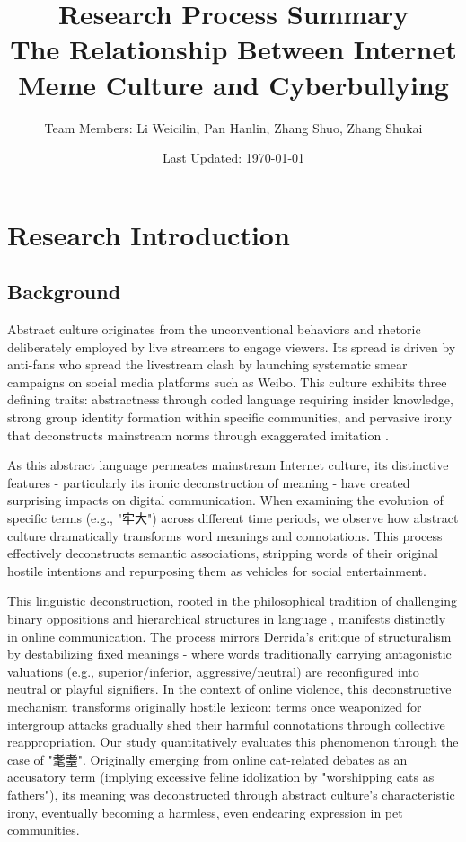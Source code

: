 \documentclass[12pt,a4paper]{ctexart}
\title{
    {\Large Research Process Summary}\\
    {\large The Relationship Between Internet Meme Culture and Cyberbullying}
}
\author{
    {\small Team Members: Li Weicilin, Pan Hanlin, Zhang Shuo, Zhang Shukai}\\
}
\date{Last Updated: \today}
\theoremstyle{MyLineTheoremStyle}
\theoremstyle{MyBlockTheoremStyle}
\theoremstyle{MySubsubsectionStyle}
\begin{document}
\maketitle
\tableofcontents
\newpage

\section{Research Introduction}
\subsection{Background}

Abstract culture originates from the unconventional behaviors and rhetoric deliberately employed by live streamers to engage viewers. Its spread is driven by anti-fans who spread the livestream clash by launching systematic smear campaigns on social media platforms such as Weibo. This culture exhibits three defining traits: abstractness through coded language requiring insider knowledge, strong group identity formation within specific communities, and pervasive irony that deconstructs mainstream norms through exaggerated imitation \cite{zheng2024chinese}.

As this abstract language permeates mainstream Internet culture, its distinctive features - particularly its ironic deconstruction of meaning - have created surprising impacts on digital communication. When examining the evolution of specific terms (e.g., "牢大") across different time periods, we observe how abstract culture dramatically transforms word meanings and connotations. This process effectively deconstructs semantic associations, stripping words of their original hostile intentions and repurposing them as vehicles for social entertainment.

This linguistic deconstruction, rooted in the philosophical tradition of challenging binary oppositions and hierarchical structures in language \cite{liu2019deconstruction}, manifests distinctly in online communication. The process mirrors Derrida's critique of structuralism by destabilizing fixed meanings - where words traditionally carrying antagonistic valuations (e.g., superior/inferior, aggressive/neutral) are reconfigured into neutral or playful signifiers. In the context of online violence, this deconstructive mechanism transforms originally hostile lexicon: terms once weaponized for intergroup attacks gradually shed their harmful connotations through collective reappropriation. Our study quantitatively evaluates this phenomenon through the case of "耄耋". Originally emerging from online cat-related debates as an accusatory term (implying excessive feline idolization by "worshipping cats as fathers"), its meaning was deconstructed through abstract culture's characteristic irony, eventually becoming a harmless, even endearing expression in pet communities.
\end{document}
